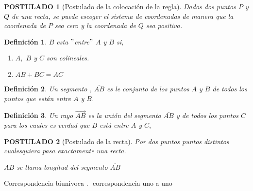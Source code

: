 \documentclass[10pt]{book}
\newtheorem{def.}{\textbf{Definición}}[chapter]%
\newtheorem{post}{\textbf{POSTULADO}}[part]%
\begin{document}
\begin{tcolorbox}
\begin{post}[Postulado de la colocación de la regla]
Dados dos puntos $P$ y $Q$ de una recta, se puede escoger el sistema de coordenadas de manera que la coordenada de $P$ sea cero y la coordenada de $Q$ sea positiva.\\
\end{post}
\begin{def.} $B$ esta $"$entre$"$ $A$ y $B$ si,
\begin{enumerate}[\bfseries i)]
\item $A,$ $B$ y $C$ son colineales.
\item $AB + BC = AC$\\
\end{enumerate}
\end{def.}
\begin{def.}
Un segmento , $\overline{AB}$ es le conjunto de los puntos $A$ y $B$ de todos los puntos que están entre $A$ y $B$.\\
\end{def.}
\begin{def.}
Un rayo $\overrightarrow{AB}$ es la unión del segmento $\overline{AB}$ y de todos los puntos $C$ para los cuales es verdad que $B$ está entre $A$ y $C,$
\begin{center}
\end{center}
\end{def.}
\end{tcolorbox}

\begin{tcolorbox}
\begin{post}[Postulado de la recta]
Por dos puntos puntos distintos cualesquiera pasa exactamente una recta.
\begin{center}
$AB$ se llama longitud del segmento $\overline{AB}$\\
\end{center}
\end{post}
Correspondencia biunivoca .- correspondencia uno a uno
\end{tcolorbox}
\end{document}
